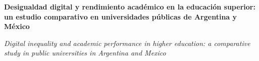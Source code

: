 \documentclass{article}
\renewcommand{\normalsize}{\fontsize{10pt}{13pt}\selectfont}
\newcommand{\articulotipo}{}
\newcommand{\articulotitulo}{}
\newcommand{\articulosubtitulo}{}
\newcommand{\articulotitulotrans}{}
\newcommand{\articuloautores}{}
\newcommand{\articulodoi}{}
\newcommand{\articuloidiomaxml}{es}
\newcommand{\articulorevista}{}
\newcommand{\articuloissne}{}
\newcommand{\articulovolumen}{}
\newcommand{\articulonumero}{}
\newcommand{\articulofecha}{}
\newcommand{\articulopagina}{0}
\begin{document}

\renewcommand{\articuloidiomaxml}{es}
\renewcommand{\articulotitulo}{Desigualdad digital y rendimiento académico en la educación superior: un estudio comparativo en universidades públicas de Argentina y México}
\renewcommand{\articulosubtitulo}{.}
\renewcommand{\articuloautores}{Brenda Acosta}
\renewcommand{\articulodoi}{10.1038/s41586-024-07421-0}
\renewcommand{\articulotipo}{ARTÍCULO DE INVESTIGACIÓN}
\renewcommand{\articulorevista}{Revista argentina de ideas}
\renewcommand{\articuloissne}{1518-8787}
\renewcommand{\articulovolumen}{01}
\renewcommand{\articulonumero}{01}
\renewcommand{\articulofecha}{ 2026}
\renewcommand{\articulopagina}{5}

\setcounter{page}{5}
\thispagestyle{firstpage}

\noindent\begin{minipage}[t]{\dimexpr\textwidth+\marginparsep+\marginparwidth\relax}%
{\sffamily\bfseries\Large\articulotitulo\par}%
\end{minipage}\par
\vspace{3mm}%
\renewcommand{\articulotitulotrans}{Digital inequality and academic performance in higher education: a comparative study in public universities in Argentina and Mexico}
\noindent\begin{minipage}[t]{\dimexpr\textwidth+\marginparsep+\marginparwidth\relax}%
{\sffamily\itshape\normalsize\articulotitulotrans\par}%
\end{minipage}\par
\vspace{4mm}%
\end{document}
